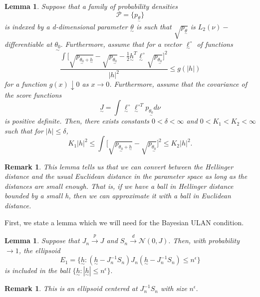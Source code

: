 \documentclass[twoside]{article}
\newtheorem{lemma}[theorem]{Lemma}
\newtheorem{remark}[theorem]{Remark}
\newcommand{\utilde}{\underset{\sim}}
\begin{document}
\begin{lemma}Suppose that a family of probability densities 
$$
\mathcal{P} = \{p_{\utilde{\theta}}\}
$$
is indexed by a d-dimensional parameter $\utilde{\theta}$ is such that $\sqrt{p_{\utilde{\theta}}}$ is $L_2(\nu)-$differentiable at $\utilde{\theta_0}.$ Furthermore, assume that for a vector $\utilde{\ell}^{\circ}$ of functions 
$$
\frac{\int\bigg[\sqrt{p_{\utilde{\theta_0} + \utilde{h}}} - \sqrt{p_{\utilde{\theta_0}}} - \frac{1}{2}\utilde{h}^T\utilde{\ell}^{\circ}\sqrt{p_{\utilde{\theta_0}}}\bigg]^2 }{|h|^2} \leq g(|h|)
$$
for a function $g(x) \downarrow 0$ as $x \rightarrow 0$. Furthermore, assume that the covariance of the score functions
$$
\utilde{J} = \int \utilde{\ell}^{\circ}\utilde{\ell}^{\circ T}p_{\utilde{\theta_0}}d\nu
$$
is positive definite. Then, there exists constants $0 < \delta < \infty$ and $0 < K_1 < K_2 < \infty$ such that for $|h| \leq \delta$, 
$$
K_1|h|^2 \leq \int \bigg[\sqrt{p_{\utilde{\theta_{0}} + \utilde{h}}} - \sqrt{p_{\utilde{\theta_0}}} \bigg]^2 \leq K_2|h|^2.
$$
\end{lemma}

\begin{remark}This lemma tells us that we can convert between the Hellinger distance and the usual Euclidean distance in the parameter space as long as the distances are small enough. That is, if we have a ball in Hellinger distance bounded by a small h, then we can approximate it with a ball in Euclidean distance.
\end{remark}

First, we state a lemma which we will need for the Bayesian ULAN condition.

\begin{lemma}Suppose that $J_n \xrightarrow{p} J$ and $S_n \xrightarrow{d} \mathcal{N}(0, J).$ Then, with probability $\rightarrow 1$, the ellipsoid 
$$
E_1 = \{\utilde{h}: (\utilde{h} - J_n^{-1}S_n)J_n(\utilde{h} - J_n^{-1}S_n) \leq n^{\epsilon}\}
$$
is included in the ball $\{\utilde{h}: |\utilde{h}| \leq n^{\epsilon}\}.$
\end{lemma}

\begin{remark}This is an ellipsoid centered at $J_n^{-1}S_n$ with size $n^{\epsilon}.$
\end{remark}
\end{document}
